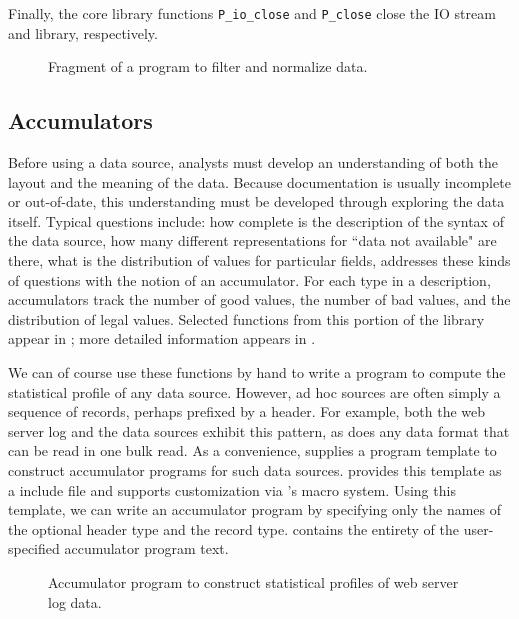 Finally, the core library functions \texttt{P\_io\_close} and \texttt{P\_close} close the IO stream and \pads{} library, respectively.

\begin{figure*}
\caption{Fragment of a program to filter and normalize \dibbler{} data.}
\label{figure:sirius-filter}
\end{figure*}



\subsection{Accumulators}

Before using a data source, analysts must develop an understanding 
of both the layout and the meaning of the data.  
Because documentation is usually
incomplete or out-of-date, this understanding must be developed 
through exploring the data itself.  Typical questions include:
how complete is the description of the syntax of the data source,
how many different representations for ``data not available" are there,
what is the distribution of values for particular fields, \etc{}
\pads{} addresses these kinds of questions with the notion of an accumulator. 
For each type in a \pads{} description, accumulators track the number of good values, the number of bad values, and the 
distribution of legal values.  Selected functions from this portion of the library appear in ; more detailed information appears in .  

We can of course use these functions by hand to write a program to
compute the statistical profile of any \pads{} data source.  However,
ad hoc sources are often simply a sequence of records, perhaps
prefixed by a header.  For example, both the web server log and the
\dibbler{} data sources exhibit this pattern,  as does any data format
that can be read in one bulk read. 
As a convenience, \pads{} supplies a program
template to construct accumulator programs for such data sources.
\pads{} provides this template as a \C{} include file and supports
customization via \C{}'s macro system. 
Using this template, we can write an accumulator program by
specifying only the names of the optional header type and the record type.  
 contains the entirety of the user-specified accumulator program text.  

\begin{figure*}
\caption{Accumulator program to construct statistical profiles of web server log data.}
\label{figure:wsl-accum}
\end{figure*}



